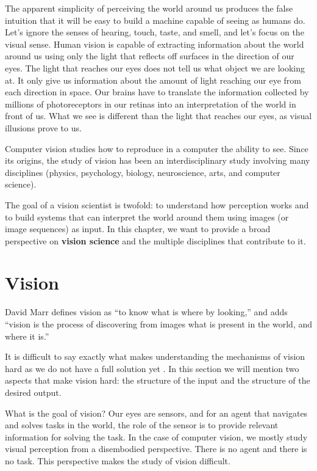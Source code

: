 The apparent simplicity of perceiving the world around us produces the false intuition that it will be easy to build a machine capable of seeing as humans do. Let's ignore the senses of hearing, touch, taste, and smell, and let's focus on the visual sense. Human vision is capable of extracting information about the world around us using only the light that reflects off surfaces in the direction of our eyes. The light that reaches our eyes does not tell us what object we are looking at. It only give us information about the amount of light reaching our eye from each direction in space. Our brains have to translate the information collected by millions of photoreceptors in our retinas into an interpretation of the world in front of us. What we see is different than the light that reaches our eyes, as visual illusions prove to us.

Computer vision studies how to reproduce in a computer the ability to see. Since its origins, the study of vision has been an interdisciplinary study involving many disciplines (physics, psychology, biology, neuroscience, arts, and computer science).

The goal of a vision scientist is twofold: to understand how perception works and to build systems that can interpret the world around them using images (or image sequences) as input. In this chapter, we want to provide a broad perspective on {\bf vision science} and the multiple disciplines that contribute to it.


\section{Vision}

David Marr \cite{Marr82} defines vision as ``to know what is where by looking,'' and  adds ``vision is the process of discovering from images what is present in the world, and where it is.''

It is difficult to say exactly what makes understanding the mechanisms of vision hard as we do not have a full solution yet \cite{Cavanagh96}. In this section we will mention two  aspects that make vision hard: the structure of the input and the structure of the desired output.

What is the goal of vision? Our eyes are sensors, and for an agent that navigates and solves tasks in the world, the role of the sensor is to provide relevant information for solving the task. In the case of computer vision, we mostly study visual perception from a disembodied perspective. There is no agent and there is no task. This perspective makes the study of vision difficult.


